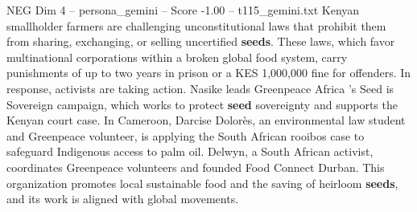\begin{textsample}{NEG Dim 4 – persona\_gemini – Score -1.00 – t115\_gemini.txt}  \label{ex:f4_neg_011}
Kenyan smallholder farmers are challenging unconstitutional laws that prohibit them from sharing, exchanging, or selling uncertified \textbf{seeds}.
These laws, which favor multinational corporations within a broken global food system, carry punishments of up to two years in prison or a KES 1,000,000 fine for offenders.
In response, activists are taking action.
Nasike leads Greenpeace Africa 's Seed is Sovereign campaign, which works to protect \textbf{seed} sovereignty and supports the Kenyan court case.
In Cameroon, Darcise Dolorès, an environmental law student and Greenpeace volunteer, is applying the South African rooibos case to safeguard Indigenous access to palm oil.
Delwyn, a South African activist, coordinates Greenpeace volunteers and founded Food Connect Durban.
This organization promotes local sustainable food and the saving of heirloom \textbf{seeds}, and its work is aligned with global movements.

\end{textsample}
